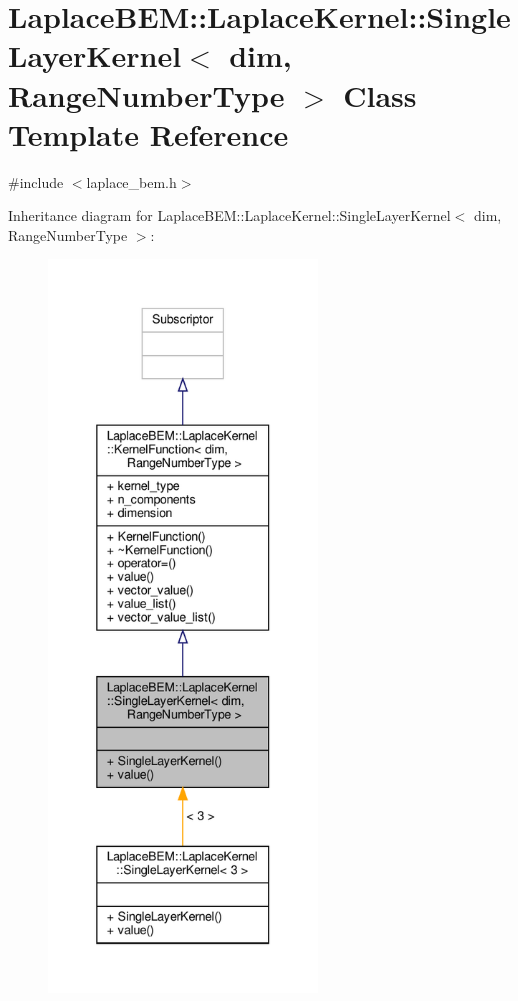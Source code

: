\hypertarget{classLaplaceBEM_1_1LaplaceKernel_1_1SingleLayerKernel}{}\section{Laplace\+B\+EM\+:\+:Laplace\+Kernel\+:\+:Single\+Layer\+Kernel$<$ dim, Range\+Number\+Type $>$ Class Template Reference}
\label{classLaplaceBEM_1_1LaplaceKernel_1_1SingleLayerKernel}


{\ttfamily \#include $<$laplace\+\_\+bem.\+h$>$}



Inheritance diagram for Laplace\+B\+EM\+:\+:Laplace\+Kernel\+:\+:Single\+Layer\+Kernel$<$ dim, Range\+Number\+Type $>$\+:\nopagebreak
\begin{figure}[H]
\begin{center}
\leavevmode
\includegraphics[height=550pt]{classLaplaceBEM_1_1LaplaceKernel_1_1SingleLayerKernel__inherit__graph}
\end{center}
\end{figure}


